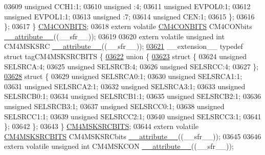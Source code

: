 \begin{DoxyCode}
03609       \textcolor{keywordtype}{unsigned} CCH1:1;
03610       \textcolor{keywordtype}{unsigned} :4;
03611       \textcolor{keywordtype}{unsigned} EVPOL0:1;
03612       \textcolor{keywordtype}{unsigned} EVPOL1:1;
03613       \textcolor{keywordtype}{unsigned} :7;
03614       \textcolor{keywordtype}{unsigned} CEN:1;
03615     \};
03616   \};
03617 \} \hyperlink{a00014_df/d91/a00335}{CM4CONBITS};
03618 \textcolor{keyword}{extern} \textcolor{keyword}{volatile} \hyperlink{a00014_df/d91/a00335}{CM4CONBITS} CM4CONbits \hyperlink{a00015_a493c46f03454991ccc5aa7a6e1dfb2a7}{\_\_attribute\_\_}((\_\_sfr\_\_));
03619 
03620 \textcolor{keyword}{extern} \textcolor{keyword}{volatile} \textcolor{keywordtype}{unsigned} \textcolor{keywordtype}{int}  CM4MSKSRC \hyperlink{a00015_a493c46f03454991ccc5aa7a6e1dfb2a7}{\_\_attribute\_\_}((\_\_sfr\_\_));
\hypertarget{a00015_source_l03621}{}\hyperlink{a00014}{03621} \_\_extension\_\_ \textcolor{keyword}{typedef} \textcolor{keyword}{struct }tagCM4MSKSRCBITS \{
\hypertarget{a00015_source_l03622}{}\hyperlink{a00015}{03622}   \textcolor{keyword}{union }\{
\hypertarget{a00015_source_l03623}{}\hyperlink{a00015}{03623}     \textcolor{keyword}{struct }\{
03624       \textcolor{keywordtype}{unsigned} SELSRCA:4;
03625       \textcolor{keywordtype}{unsigned} SELSRCB:4;
03626       \textcolor{keywordtype}{unsigned} SELSRCC:4;
03627     \};
\hypertarget{a00015_source_l03628}{}\hyperlink{a00015}{03628}     \textcolor{keyword}{struct }\{
03629       \textcolor{keywordtype}{unsigned} SELSRCA0:1;
03630       \textcolor{keywordtype}{unsigned} SELSRCA1:1;
03631       \textcolor{keywordtype}{unsigned} SELSRCA2:1;
03632       \textcolor{keywordtype}{unsigned} SELSRCA3:1;
03633       \textcolor{keywordtype}{unsigned} SELSRCB0:1;
03634       \textcolor{keywordtype}{unsigned} SELSRCB1:1;
03635       \textcolor{keywordtype}{unsigned} SELSRCB2:1;
03636       \textcolor{keywordtype}{unsigned} SELSRCB3:1;
03637       \textcolor{keywordtype}{unsigned} SELSRCC0:1;
03638       \textcolor{keywordtype}{unsigned} SELSRCC1:1;
03639       \textcolor{keywordtype}{unsigned} SELSRCC2:1;
03640       \textcolor{keywordtype}{unsigned} SELSRCC3:1;
03641     \};
03642   \};
03643 \} \hyperlink{a00014_d2/d45/a00342}{CM4MSKSRCBITS};
03644 \textcolor{keyword}{extern} \textcolor{keyword}{volatile} \hyperlink{a00014_d2/d45/a00342}{CM4MSKSRCBITS} CM4MSKSRCbits \hyperlink{a00015_a493c46f03454991ccc5aa7a6e1dfb2a7}{\_\_attribute\_\_}((\_\_sfr\_\_));
03645 
03646 \textcolor{keyword}{extern} \textcolor{keyword}{volatile} \textcolor{keywordtype}{unsigned} \textcolor{keywordtype}{int}  CM4MSKCON \hyperlink{a00015_a493c46f03454991ccc5aa7a6e1dfb2a7}{\_\_attribute\_\_}((\_\_sfr\_\_));

\end{DoxyCode}
